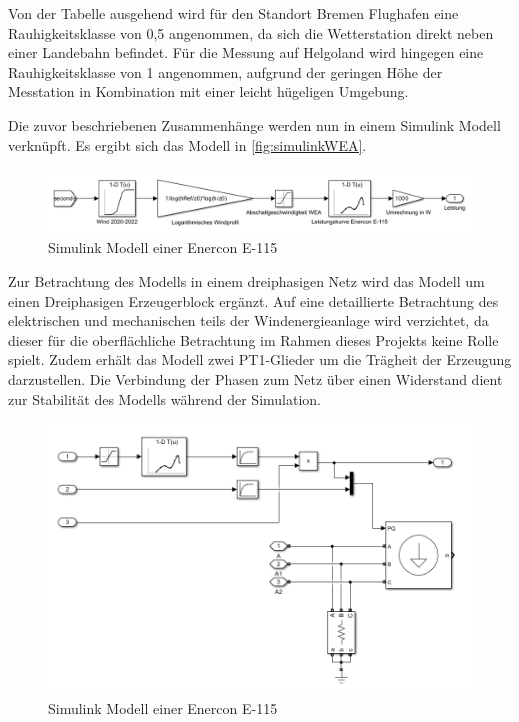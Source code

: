 Von der Tabelle ausgehend wird für den Standort Bremen Flughafen eine Rauhigkeitsklasse von 0,5 angenommen, da sich die Wetterstation direkt neben einer Landebahn befindet. Für die Messung auf Helgoland wird hingegen eine Rauhigkeitsklasse von 1 angenommen, aufgrund der geringen Höhe der Messtation in Kombination mit einer leicht hügeligen Umgebung.

Die zuvor beschriebenen Zusammenhänge werden nun in einem Simulink Modell verknüpft. Es ergibt sich das Modell in \autoref{fig:simulinkWEA}.

\begin{figure}[H]
	\centering
	\includegraphics[width=0.9\linewidth]{Abbildungen/ModellWEAeinfach.png}
	\caption{Simulink Modell einer Enercon E-115}
	\label{fig:simulinkWEA}
\end{figure}

Zur Betrachtung des Modells in einem dreiphasigen Netz wird das Modell um einen Dreiphasigen Erzeugerblock ergänzt. Auf eine detaillierte Betrachtung des elektrischen und mechanischen teils der Windenergieanlage wird verzichtet, da dieser für die oberflächliche Betrachtung im Rahmen dieses Projekts keine Rolle spielt. Zudem erhält das Modell zwei PT1-Glieder um die Trägheit der Erzeugung darzustellen. Die Verbindung der Phasen zum Netz über einen Widerstand dient zur Stabilität des Modells während der Simulation.

\begin{figure}[H]
	\centering
	\includegraphics[width=0.9\linewidth]{Abbildungen/ModellWEA.png}
	\caption{Simulink Modell einer Enercon E-115}
	\label{fig:e115}
\end{figure}


